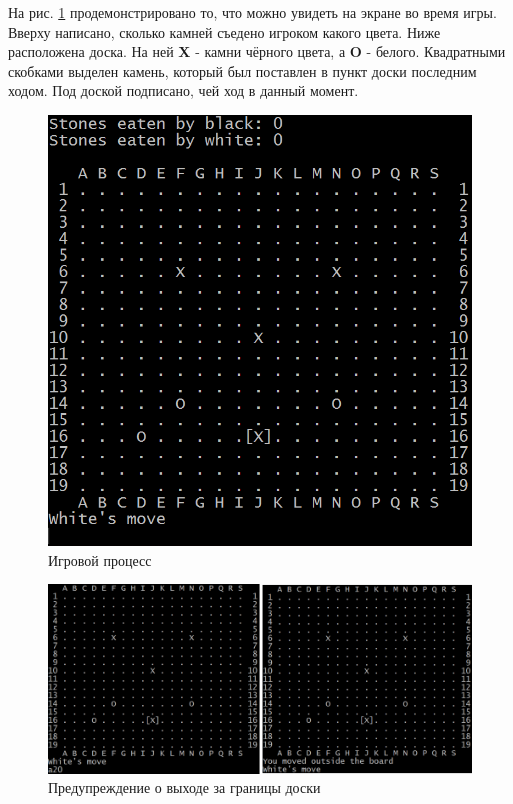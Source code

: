 На рис. \ref{pic:CUI_Process} продемонстрировано то, что можно увидеть на экране во время игры. Вверху написано, сколько камней съедено игроком какого цвета. Ниже расположена доска. На ней \textbf{X} - камни чёрного цвета, а \textbf{O} - белого. Квадратными скобками выделен камень, который был поставлен в пункт доски последним ходом. Под доской подписано, чей ход в данный момент.

\begin{figure}[H]
	\begin{center}
		\includegraphics[scale=0.6]{pics/GoCUI/Process.png}
	    \caption{Игровой процесс} 
		\label{pic:CUI_Process}
	\end{center}
\end{figure}



\begin{figure}[H]
	\begin{center}
		\includegraphics[scale=0.6]{pics/GoCUI/Out.png}
	    \caption{Предупреждение о выходе за границы доски} 
		\label{pic:CUI_Out}
	\end{center}
\end{figure}

